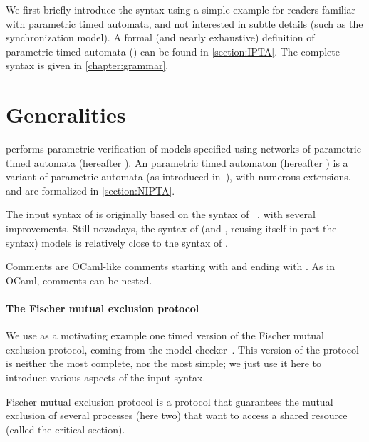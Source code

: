We first briefly introduce the syntax using a simple example for readers familiar with parametric timed automata, and not interested in subtle details (such as the synchronization model).
A formal (and nearly exhaustive) definition of \imitator{} parametric timed automata (\NIPTA{}) can be found in \cref{section:IPTA}.
The complete syntax is given in \cref{chapter:grammar}.

\section{Generalities}
\imitator{} performs parametric verification of models specified using networks of \imitator{} parametric timed automata (hereafter \NIPTA{}).
An \imitator{} parametric timed automaton (hereafter \IPTA{}) is a variant of parametric automata (as introduced in~\cite{AHV93}), with numerous extensions.
\IPTA{} and \NIPTA{} are formalized in \cref{section:NIPTA}.

The input syntax of \imitator{} is originally based on the syntax of \hytech{}~\cite{HHW95}, with several improvements.
%
Still nowadays, the syntax of \hytech{} (and \phaverLite{}, reusing itself in part the \hytech{} syntax) models is relatively close to the syntax of \imitator{}.

Comments are OCaml-like comments starting with \styleIMI{(*} and ending with \styleIMI{*)}.
As in OCaml, comments can be nested.


\paragraph{The Fischer mutual exclusion protocol}
We use as a motivating example one timed version of the Fischer mutual exclusion protocol, coming from the \pat{} model checker~\cite{SLDP09}.
This version of the protocol is neither the most complete, nor the most simple; we just use it here to introduce various aspects of the \imitator{} input syntax.

Fischer mutual exclusion protocol is a protocol that guarantees the mutual exclusion of several processes (here two) that want to access a shared resource (called the critical section).
%

